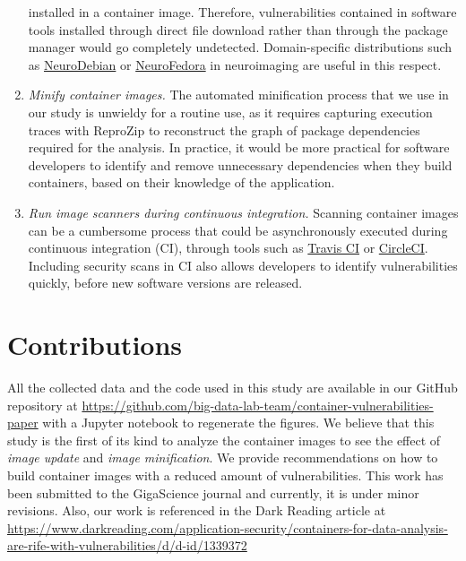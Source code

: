 \begin{enumerate}
installed in a container image. Therefore, vulnerabilities contained in
software tools installed through direct file download rather than through
the package manager would go completely undetected. Domain-specific
distributions such as \href{http://neuro.debian.net}{NeuroDebian} or
\href{https://docs.fedoraproject.org/en-US/neurofedora/overview/}{NeuroFedora}
in neuroimaging are useful in this respect.
\item \emph{Minify container images.} The automated minification
process that we use in our study is unwieldy for a routine use, as it
requires capturing execution traces with ReproZip to reconstruct the graph
of package dependencies required for the analysis. In practice, it would be
more practical for software developers to identify and remove unnecessary
dependencies when they build containers, based on their knowledge of the
application.
\item \emph{Run image scanners during continuous integration.} Scanning
container images can be a cumbersome process that
could be asynchronously executed during continuous integration (CI),
through tools such as \href{https://travis-ci.org/}{Travis CI} or \href{https://circleci.com/}{CircleCI}. Including security scans in
CI also allows developers to identify vulnerabilities quickly,
before new software versions are released.
\end{enumerate}

\section{Contributions}

All the collected
data and the code used in this study are available in our GitHub repository at
\url{https://github.com/big-data-lab-team/container-vulnerabilities-paper}
with a Jupyter notebook to regenerate the figures.
We believe that this
study is the first of its kind to analyze the container images to see
the effect of \textit{image update} and \textit{image minification}.
We provide recommendations on how to build container
images with a reduced amount of vulnerabilities. This work has been
submitted to the GigaScience journal and currently, it is under
minor revisions. Also, our work is referenced in the Dark Reading
article at \href{https://www.darkreading.com/application-security/containers-for-data-analysis-are-rife-with-vulnerabilities/d/d-id/1339372}
{https://www.darkreading.com/application-security/containers-for-data-analysis-are-rife-with-vulnerabilities/d/d-id/1339372}

